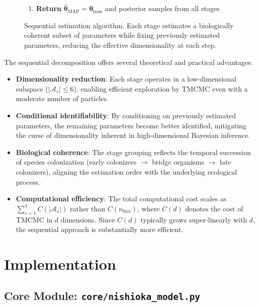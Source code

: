 \documentclass[11pt,a4paper]{article}
\begin{document}
\begin{figure}[htbp]
{\begin{minipage}{0.92\textwidth}
\begin{enumerate}
\begin{enumerate}
    \end{enumerate}
    \item[\textbf{3.}] \textbf{Return} $\hat{\boldsymbol{\theta}}_{\mathrm{MAP}} = \boldsymbol{\theta}_{\mathrm{base}}$ and posterior samples from all stages
\end{enumerate}
\vspace{0.2cm}
\end{minipage}}
\caption{Sequential estimation algorithm. Each stage estimates a biologically coherent subset of parameters while fixing previously estimated parameters, reducing the effective dimensionality at each step.}
\label{alg:sequential}
\end{figure}

The sequential decomposition offers several theoretical and practical advantages:
\begin{itemize}
    \item \textbf{Dimensionality reduction}: Each stage operates in a low-dimensional subspace ($|\mathcal{A}_s| \leq 6$), enabling efficient exploration by TMCMC even with a moderate number of particles.
    \item \textbf{Conditional identifiability}: By conditioning on previously estimated parameters, the remaining parameters become better identified, mitigating the curse of dimensionality inherent in high-dimensional Bayesian inference.
    \item \textbf{Biological coherence}: The stage grouping reflects the temporal succession of species colonization (early colonizers $\to$ bridge organisms $\to$ late colonizers), aligning the estimation order with the underlying ecological process.
    \item \textbf{Computational efficiency}: The total computational cost scales as $\sum_{s=1}^{4} C(|\mathcal{A}_s|)$ rather than $C(n_{\mathrm{free}})$, where $C(d)$ denotes the cost of TMCMC in $d$ dimensions. Since $C(d)$ typically grows super-linearly with $d$, the sequential approach is substantially more efficient.
\end{itemize}

\section{Implementation}

\subsection{Core Module: \texttt{core/nishioka\_model.py}}
\end{document}
